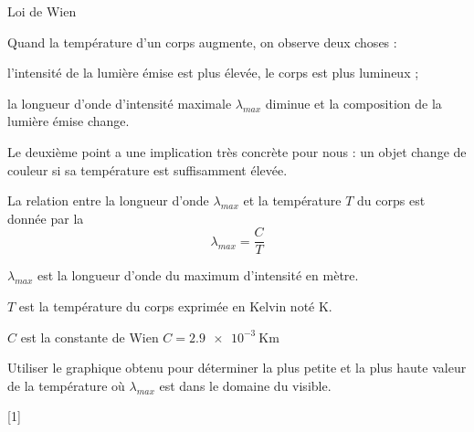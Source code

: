 \pasCorrection{\vspace*{-4pt}}
\begin{doc}{Loi de Wien}
  \begin{figure}
    \vspace*{-28pt}
    \centering
  \end{figure}
  
  Quand la température d'un corps augmente, on observe deux choses :
  \begin{listeTirets}
    \item l'intensité de la lumière émise est plus élevée, le corps est plus lumineux ;
    \item la longueur d'onde d'intensité maximale $\lambda_{max}$ diminue et la composition de la lumière émise change.
  \end{listeTirets}
  Le deuxième point a une implication très concrète pour nous : un objet change de couleur si sa température est suffisamment élevée.

  \begin{importants}
    La relation entre la longueur d'onde $\lambda_{max}$ et la température $T$ du corps est donnée par la 
    \begin{equation*}
      \lambda_{max} = \dfrac{C}{T}
    \end{equation*}
    \begin{listePoints}
      \item $\lambda_{max}$ est la longueur d'onde du maximum d'intensité en mètre.
      \item $T$ est la température du corps exprimée en Kelvin noté \unit{\kelvin}.
      \item $C$ est la constante de Wien $C = \qty{2,9e-3}{\kelvin\m}$
    \end{listePoints}
  \end{importants}
\end{doc}


\mesure
Utiliser le graphique obtenu pour déterminer la plus petite et la plus haute valeur de la température où $\lambda_{max}$ est dans le domaine du visible.

[1]

